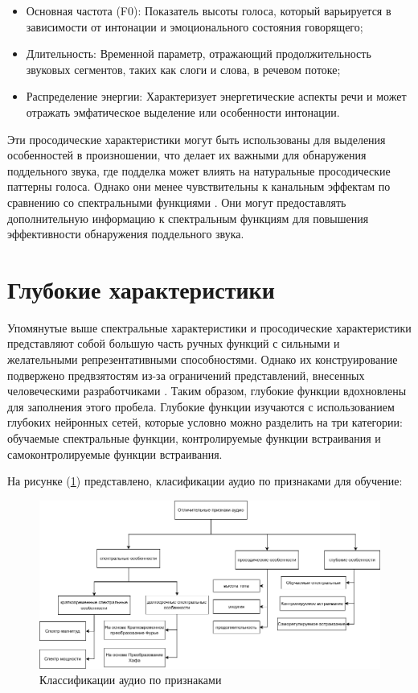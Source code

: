 \begin{itemize}
    \item Основная частота (F0): Показатель высоты голоса, который варьируется в зависимости от интонации и эмоционального состояния говорящего;
    \item Длительность: Временной параметр, отражающий продолжительность звуковых сегментов, таких как слоги и слова, в речевом потоке;
    \item Распределение энергии: Характеризует энергетические аспекты речи и может отражать эмфатическое выделение или особенности интонации.
\end{itemize}

Эти просодические характеристики могут быть использованы для выделения особенностей в произношении, что делает их важными для обнаружения поддельного звука, где подделка может влиять на натуральные просодические паттерны голоса. Однако они менее чувствительны к канальным эффектам по сравнению со спектральными функциями \cite{wu2015spoofing}. Они могут предоставлять дополнительную информацию к спектральным функциям для повышения эффективности обнаружения поддельного звука.

\section{Глубокие характеристики}

Упомянутые выше спектральные характеристики и просодические характеристики представляют собой большую часть ручных функций с сильными и желательными репрезентативными способностями. Однако их конструирование подвержено предвзятостям из-за ограничений представлений, внесенных человеческими разработчиками \cite{zeghidour2021leaf}. Таким образом, глубокие функции вдохновлены для заполнения этого пробела. Глубокие функции изучаются с использованием глубоких нейронных сетей, которые условно можно разделить на три категории: обучаемые спектральные функции, контролируемые функции встраивания и самоконтролируемые функции встраивания.

На рисунке (\ref{fig:audio-classification}) представлено, класификации аудио по признаками для обучение: 
\begin{figure}[H]
	\centering
	\includegraphics[width=0.9\linewidth]{images/classification-of-audio.png}
	\caption{Классификации аудио по признаками}
	\label{fig:audio-classification}
\end{figure}


